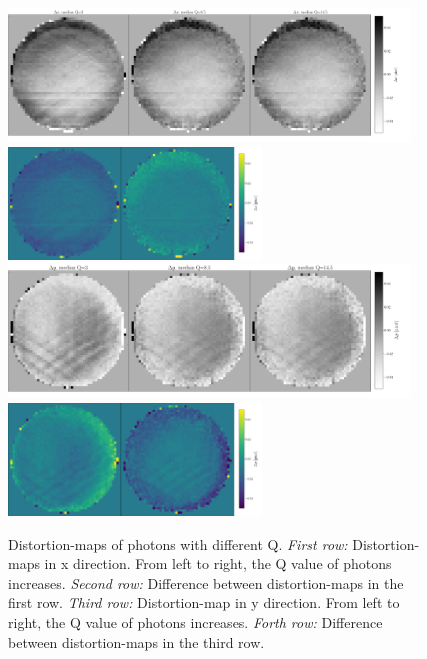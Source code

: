\documentclass[12pt, preprint]{aastex}
\begin{document}
\begin{figure}[p]
\begin{center}
\includegraphics[width=0.95\textwidth]{figures/q-x}
\includegraphics[width=0.6\textwidth]{figures/dif-q-x}
\includegraphics[width=0.95\textwidth]{figures/q-y}
\includegraphics[width=0.6\textwidth]{figures/dif-q-y}

\end{center}
\caption{%
  \label{distortion_q}
  Distortion-maps of photons with different Q.
  \emph{First row:} Distortion-maps in x direction. 
  From left to right, the Q value of photons increases.
  \emph{Second row:} Difference between distortion-maps in the first row.
  \emph{Third row:} Distortion-map in y direction.
  From left to right, the Q value of photons increases.
  \emph{Forth row:} Difference between distortion-maps in the third row.
  }
\end{figure}
\end{document}
